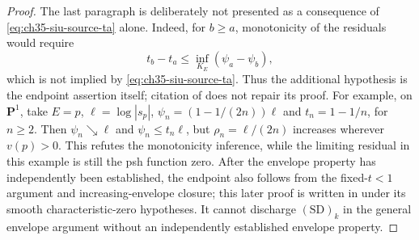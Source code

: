 \begin{proof}
The last paragraph is deliberately not presented as a consequence of
\eqref{eq:ch35-siu-source-ta} alone.  Indeed, for $b\geq a$, monotonicity
of the residuals would require
\begin{equation}
\label{eq:ch35-siu-residual-monotonicity-test}
 t_b-t_a
 \leq\inf_{K_E}(\psi_a-\psi_b),
\end{equation}
which is not implied by \eqref{eq:ch35-siu-source-ta}.  Thus the
additional hypothesis is the endpoint assertion itself; citation of
\cite[Theorem~6.21]{BJ22} does not repair its proof. For example, on
$\mathbf P^1$, take $E=p$, $\ell=\log|s_p|$,
$\psi_n=(1-1/(2n))\ell$ and $t_n=1-1/n$, for $n\geq2$. Then
$\psi_n\searrow\ell$ and $\psi_n\leq t_n\ell$, but
$\rho_n=\ell/(2n)$ increases wherever $v(p)>0$. This refutes the
monotonicity inference, while the limiting residual in this example is
still the psh function zero.  After the envelope property has independently
been established, the endpoint also follows from the fixed-$t<1$
argument and increasing-envelope closure; this later proof is written in
\cite[Proposition~17]{BJGreen24} under its smooth characteristic-zero
hypotheses.  It cannot discharge $\mathrm{(SD)}_k$ in the general envelope argument
without an independently established envelope property.
\end{proof}

